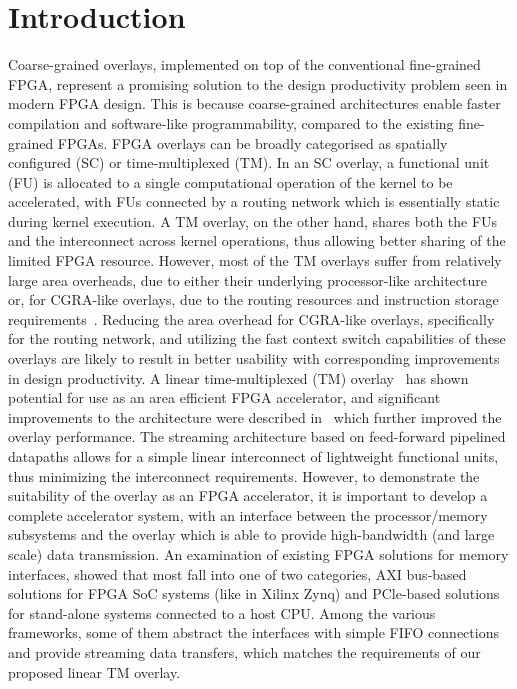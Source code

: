 \section{Introduction}
Coarse-grained overlays, implemented on top of the conventional fine-grained FPGA, represent a promising solution to the design productivity problem seen in modern FPGA design. 
This is because coarse-grained architectures enable faster compilation and software-like programmability, compared to the existing fine-grained FPGAs.  
FPGA overlays can be broadly categorised as spatially configured (SC) or time-multiplexed (TM). 
In an SC overlay, a functional unit (FU) is allocated to a single computational operation of the kernel to be accelerated, with FUs connected by a routing network which is essentially static during kernel execution. 
A TM overlay, on the other hand, shares both the FUs and the interconnect across kernel operations, thus allowing better sharing of the limited FPGA resource. 
However, most of the TM overlays suffer from relatively large area overheads, due to either their underlying processor-like architecture~\cite{severance2013embedded, rashid2014comparing, al2016fgpu, gray2016grvi, duarte2017scratch} or, for CGRA-like overlays, due to the routing resources and instruction storage requirements~\cite{paul2012remorph, liu2015quickdough}. 
Reducing the area overhead for CGRA-like overlays, specifically for the routing network, and utilizing the fast context switch capabilities of these overlays are likely to result in better usability with corresponding improvements in design productivity. 
A linear time-multiplexed (TM) overlay~\cite{li2016area} has shown potential for use as an area efficient FPGA accelerator, and significant improvements to the architecture were described in~\cite{li2018time} which further improved the overlay performance. 
The streaming architecture based on feed-forward pipelined datapaths allows for a simple linear interconnect of lightweight functional units, thus minimizing the interconnect requirements. 
However, to demonstrate the suitability of the overlay as an FPGA accelerator, it is important to develop a complete accelerator system, with an interface between the processor/memory subsystems and the overlay which is able to provide high-bandwidth (and large scale) data transmission.
An examination of existing FPGA solutions for memory interfaces, showed that most fall into one of two categories, AXI bus-based solutions for FPGA SoC systems (like in Xilinx Zynq) and PCle-based solutions for stand-alone systems connected to a host CPU. 
Among the various frameworks, some of them abstract the interfaces with simple FIFO connections and provide streaming data transfers, which matches the requirements of our proposed linear TM overlay. 

